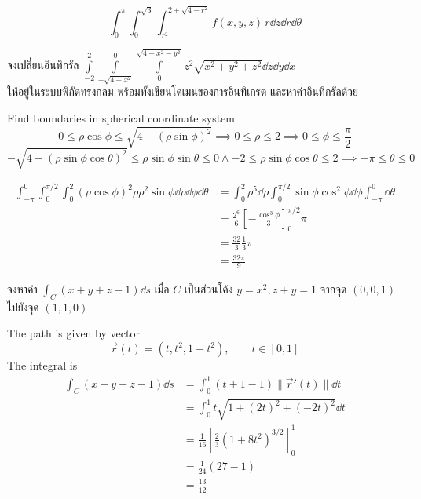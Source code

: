 \documentclass[12pt,final]{novelette} %
\begin{document}
\begin{question}
\begin{question}
        $$
            \boxed{\int_0^{\pi} \int_{0}^{\sqrt3} \int_{r^2}^{2+\sqrt{4-r^2}} f(x, y, z)\, r \dd{z} \dd{r} \dd{\theta}}
        $$
    \end{question}

    \item {}
    จงเปลี่ยนอินทิกรัล $\displaystyle \int\limits_{-2}^2 \int\limits_{-\sqrt{4-x^2}}^0 \int\limits_0^{\sqrt{4-x^2-y^2}} z^2 \sqrt{x^2 + y^2 + z^2} \dd{z} \dd{y} \dd{x}$ \\[.5em]
    ให้อยู่ในระบบพิกัดทรงกลม พร้อมทั้งเขียนโดเมนของการอินทิเกรต และหาค่าอินทิกรัลด้วย 

    \bigskip
    Find boundaries in spherical coordinate system
    $$ 0 \leq \rho \cos\phi \leq \sqrt{4 - (\rho \sin\phi)^2} \implies 0 \leq \rho \leq 2 \implies 0 \leq \phi \leq \frac{\pi}{2} $$
    $$ -\sqrt{4 - (\rho \sin\phi \cos\theta)^2} \leq \rho \sin\phi \sin\theta \leq 0 \land -2 \leq \rho \sin\phi \cos\theta \leq 2 \implies -\pi \leq \theta \leq 0$$

    \begin{align*}
        \int_{-\pi}^0 \int_0^{\pi/2} \int_0^2 (\rho \cos\phi)^2 \rho \rho^2 \sin\phi \dd{\rho} \dd{\phi} \dd{\theta}
         & = \int_0^2 \rho^5 \dd{\rho} \int_0^{\pi/2} \sin \phi \cos^2\phi \dd{\phi} \int_{-\pi}^0 \dd{\theta} \\
         & = \frac{2^6}{6} \left[-\frac{\cos^3\phi}{3}\right]_0^{\pi/2} \pi                                    \\
         & = \frac{32}{3} \frac{1}{3} \pi                                                                      \\
         & = \boxed{\frac{32\pi}{9}}
    \end{align*}

    \item {}
    \begin{question}
        \item
        จงหาค่า $\int_C (x + y + z - 1) \dd{s}$ เมื่อ $C$ เป็นส่วนโค้ง $y = x^2, z + y = 1$ จากจุด $(0,0,1)$ ไปยังจุด $(1,1,0)$ 

        \bigskip
        The path is given by vector
        $$
            \vec{r}(t) = (t, t^2, 1-t^2), \qquad t \in [0, 1]
        $$
        The integral is
        \begin{align*}
            \int_C (x + y + z - 1) \dd{s}
             & =\int_0^1 (t + 1 - 1) \lVert \vec{r}'(t) \rVert \dd{t}  \\
             & =\int_0^1 t \sqrt{1 + (2t)^2 + (-2t)^2} \dd{t}          \\
             & = \frac1{16} \left[\frac23 (1 + 8t^2)^{3/2} \right]_0^1 \\
             & = \frac1{24} (27 - 1)                                   \\
             & = \boxed{\frac{13}{12}}
        \end{align*}


\end{question}
\end{question}
\end{document}
